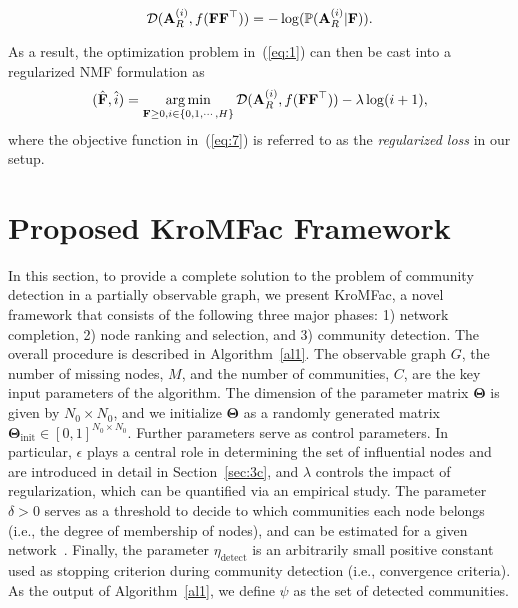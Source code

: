 \documentclass[format=acmsmall, review=false, screen=true]{acmart}
\def \log{\operatorname{log}}
\newcommand{\argmin}{\mathop{\mathrm{arg\,min}}}
\begin{document}
\begin{equation}\label{eq:D1}
\mathcal{D}({\bf A}^{(i)}_R, f({\bf F}{\bf F}^\top)) = -\log(\mathbb{P}({\bf A}_R^{(i)}|{\bf F})). 
\end{equation}

As a result, the optimization problem in~(\ref{eq:1}) can then be cast into a regularized NMF formulation as
\begin{equation}\label{eq:7}
(\hat{{\bf F}}, \hat{i})=\argmin_{{\bf F} \geq 0, i \in\{0,1,\cdots,H\} } \mathcal{D}({\bf A}^{(i)}_R, f({\bf F}{\bf F}^\top))-\lambda\log(i+1),
\end{equation}
where the objective function in~(\ref{eq:7}) is referred to as the {\em regularized loss} in our setup.



\section{Proposed \textsf{KroMFac} Framework}\label{sec:4}
In this section, to provide a complete solution to the problem of community detection in a partially observable graph, we present \textsf{KroMFac}, a novel framework that consists of the following three major phases: 1) network completion, 2) node ranking and selection, and 3) community detection. The overall procedure is described in Algorithm~\ref{al1}. The observable graph $G$, the number of missing nodes, $M$, and the number of communities, $C$, are the key input  parameters of the algorithm. The dimension of the parameter matrix $\bm{\Theta}$ is given by $N_0 \times N_0$, and we initialize $\bm{\Theta}$ as a randomly generated matrix $\bm{\Theta}_{\text{init}} \in [0,1]^{N_0 \times N_0}$. Further parameters serve as control parameters. In particular, $\epsilon$ plays a central role in determining the set of influential nodes and are introduced in detail in Section~\ref{sec:3c}, and $\lambda$ controls the impact of regularization, which can be quantified via an empirical study. The parameter $\delta > 0$ serves as a threshold to decide to which communities each node belongs (i.e., the degree of membership of nodes), and can be estimated for a given network~\cite{bigclam}. Finally, the parameter $\eta_{\text{detect}}$ is an arbitrarily small positive constant used as stopping criterion during community detection (i.e., convergence criteria). As the output of Algorithm~\ref{al1}, we define $\psi$ as the set of detected communities.
\end{document}
